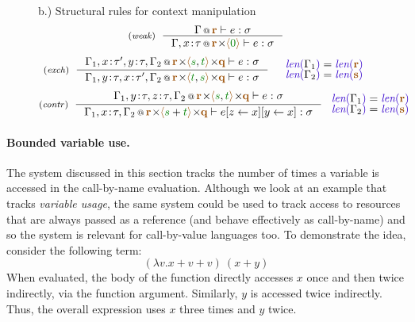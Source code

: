 \begin{figure}[t]
b.) Structural rules for context manipulation
\begin{equation*}
\tyrule{weak}
  {\coctx{\Gamma}{ \aclrd{\textbf{r}} } \vdash e : \sigma}
  {\coctx{\Gamma,x \!:\! \tau}{\aclrd{\textbf{r}} \cons \alift{ \cclrd{0} }} \vdash e : \sigma}
\end{equation*}
\begin{equation*}
\tyrule{exch}
  {\coctx{\Gamma_1,x\!:\!\tau',y\!:\!\tau,\Gamma_2}{\aclrd{\textbf{r}} \cons\alift{\cclrd{s},\cclrd{t}} \cons \aclrd{\textbf{q}}} \vdash e : \sigma}
  {\coctx{\Gamma_1,y\!:\!\tau,x\!:\!\tau',\Gamma_2}{\aclrd{\textbf{r}} \cons\alift{\cclrd{t},\cclrd{s}} \cons \aclrd{\textbf{q}}} \vdash e : \sigma}
\quad
\begin{array}{l}
\slen{\Gamma_1} = \slen{\aclrd{\textbf{r}}}\\[-0.25em]
\slen{\Gamma_2} = \slen{\aclrd{\textbf{s}}}
\end{array}
\end{equation*}
\begin{equation*}
\tyrule{contr}
  {\coctx{\Gamma_1,y\!:\!\tau,z\!:\!\tau,\Gamma_2}{\aclrd{\textbf{r}} \cons \alift{\cclrd{s},\cclrd{t}} \cons \aclrd{\textbf{q}}} \vdash e : \sigma}
  {\coctx{\Gamma_1,x\!:\!\tau,\Gamma_2}{\aclrd{\textbf{r}} \cons \alift{\cclrd{s}+\cclrd{t}} \cons \aclrd{\textbf{q}}} \vdash \subst{\subst{e}{z}{x}}{y}{x} : \sigma}
~
\begin{array}{l}
\slen{\Gamma_1} = \slen{\aclrd{\textbf{r}}}\\[-0.25em]
\slen{\Gamma_2} = \slen{\aclrd{\textbf{s}}}
\end{array}
\end{equation*}

\label{fig:applications-struct-bll}
\vspace{-1em}
\end{figure}


\paragraph{Bounded variable use.}
The system discussed in this section tracks the number of times a variable is accessed in the
call-by-name evaluation. Although we look at an example that tracks \emph{variable usage}, the same
system could be used to track access to resources that are always passed as a reference (and behave
effectively as call-by-name) and so the system is relevant for call-by-value languages too.
To demonstrate the idea, consider the following term:
%
\begin{equation*}
(\lambda v.x + v + v)~(x+y)
\end{equation*}
%
When evaluated, the body of the function directly accesses $x$ once and then twice indirectly, via
the function argument. Similarly, $y$ is accessed twice indirectly. Thus, the overall expression uses
$x$ three times and $y$ twice.

